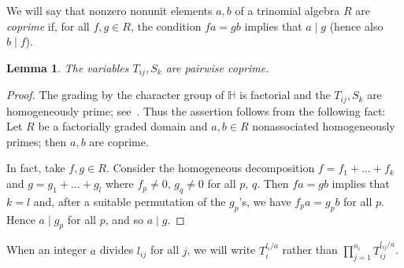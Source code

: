 \documentclass[a4paper,reqno,12pt]{amsart}
\theoremstyle{plain}
\theoremstyle{definition}
\theoremstyle{plain}
\newtheorem{lemma}[theorem]{Lemma}
\theoremstyle{remark}
\newcommand{\HH}{\mathbb H}
\begin{document}
We will say that nonzero nonunit elements $a,b$ of a trinomial algebra $R$ are \emph{coprime} if, for all $f,g\in R$, the condition $fa=gb$ implies that $a\mid g$ (hence also $b\mid f$).
\begin{lemma}\label{LemmaCoprime}\label{LemmaCoprimeFoolly}
    The variables $T_{ij}, S_k$ are pairwise coprime.   
\end{lemma}
\begin{proof}
    The grading by the character group of $\HH$ is factorial and the $T_{ij}, S_k$ are homogeneously prime; see~\cite[Theorem~1.2\,$(ii,\,iii)$]{HW}. Thus the assertion follows from the following fact: Let $R$ be a factorially graded domain and $a,b\in R$ nonassociated homogeneously primes; then $a,b$ are coprime. 
    
    In fact, take $f,g\in R$. Consider the homogeneous decomposition $f=f_1+\ldots+f_k$ and $g=g_1+\ldots+g_l$ where $f_p\neq0,\,g_q\neq0$ for all $p,\,q$. Then $fa=gb$ implies that $k=l$ and, after a suitable permutation of the $g_p$'s, we have $f_pa=g_{p}b$ for all $p$. Hence $a\mid g_{p}$ for all $p$, and so $a\mid g$.
\end{proof}
When an integer $a$ divides $l_{ij}$ for all $j$, we will write %
$T_i^{l_i/a}$ rather than $\prod_{j=1}^{n_i} T_{ij}^{l_{ij}/a}$. %
\end{document}
